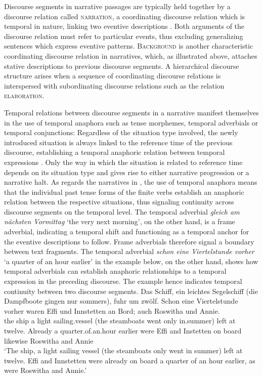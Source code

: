 \documentclass[output=paper,colorlinks,citecolor=brown]{langscibook}
\begin{document}
Discourse segments in narrative passages are typically held together by a discourse relation called \textsc{narration}, a coordinating discourse relation which is temporal in nature, linking two eventive descriptions \citep{Smith2003, altshuler2021}. Both arguments of the discourse relation must refer to particular events, thus excluding generalizing sentences which express eventive patterns. \textsc{Background} is another characteristic coordinating discourse relation in narratives, which, as illustrated above, attaches stative descriptions to previous discourse segments. A hierarchical discourse structure arises when a sequence of coordinating discourse relations is interspersed with subordinating discourse relations such as the relation \textsc{elaboration}. 

Temporal relations between discourse segments in a narrative manifest themselves in the use of temporal anaphora such as tense morphemes, temporal adverbials or temporal conjunctions: Regardless of the situation type involved, the newly introduced situation is always linked to the reference time of the previous discourse, establishing a temporal anaphoric relation between temporal expressions \citep{hinrichs1986,partee1984,Smith2003}. Only the way in which the situation is related to reference time depends on its situation type and gives rise to either narrative progression or a narrative halt. As regards the narratives in , the use of temporal anaphora means that the individual past tense forms of the finite verbs establish an anaphoric relation between the respective situations, thus signaling continuity across discourse segments on the temporal level. The temporal adverbial \textit{gleich am n\"achsten Vormittag} `the very next morning', on the other hand, is a frame adverbial, indicating a temporal shift and functioning as a temporal anchor for the eventive descriptions to follow. Frame adverbials therefore signal a boundary between text fragments. The temporal adverbial \textit{schon eine Viertelstunde vorher} `a quarter of an hour earlier' in the example below, on the other hand, shows how temporal adverbials can establish anaphoric relationships to a temporal expression in the preceding discourse. The example hence indicates temporal continuity between two discourse segments.
\eal
\gll Das Schiff, ein leichtes Segelschiff (die Dampfboote gingen nur sommers), fuhr um zwölf. Schon eine Viertelstunde vorher waren Effi und Innstetten an Bord; auch Roswitha und Annie. \\ the ship a light sailing.vessel (the steamboats went only in.summer) left at twelve. Already a quarter.of.an.hour earlier were Effi and Instetten on board likewise Roswitha and Annie  \\  
\glt `The ship, a light sailing vessel (the steamboats only went in summer) left at twelve. Effi and Innstetten were already on board a quarter of an hour earlier, as were Roswitha and Annie.' 
\zl
\end{document}
